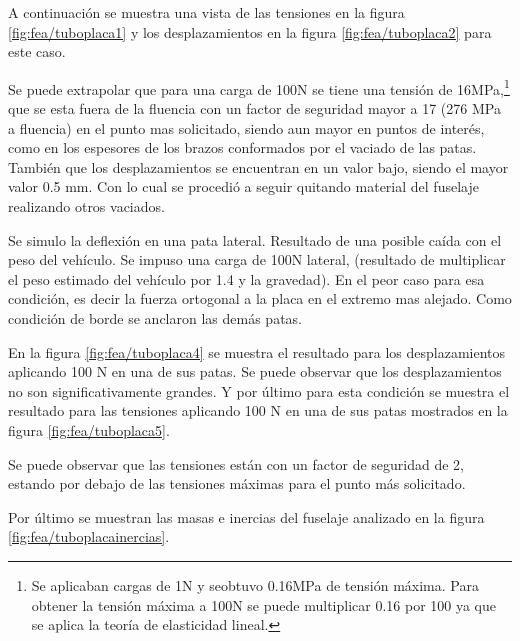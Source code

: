 A continuación se muestra una vista de las tensiones en la figura \ref{fig:fea/tuboplaca1} y los desplazamientos en la figura \ref{fig:fea/tuboplaca2} para este caso.

Se puede extrapolar que para una carga de 100N se tiene una tensión de 16MPa,\footnote{Se aplicaban cargas de 1N y seobtuvo 0.16MPa de tensión máxima. Para obtener la tensión máxima a 100N se puede multiplicar 0.16 por 100 ya que se aplica la teoría de elasticidad lineal.} que se esta fuera de la fluencia con un factor de seguridad mayor a 17 (276 MPa a fluencia) en el punto mas solicitado, siendo aun mayor en puntos de interés, como en los espesores de los brazos conformados por el vaciado de las patas. También que los desplazamientos se encuentran en un valor bajo, siendo el mayor valor 0.5 mm. Con lo cual se procedió a seguir quitando material del fuselaje realizando otros vaciados.

Se simulo la deflexión en una pata lateral. Resultado de una posible caída con el peso del vehículo. Se impuso una carga de 100N lateral,  (resultado de multiplicar el peso estimado del vehículo por 1.4 y la gravedad). En el peor caso para esa condición, es decir la fuerza ortogonal a la placa en el extremo mas alejado. Como condición de borde se anclaron las demás patas.

En la figura \ref{fig:fea/tuboplaca4} se muestra el resultado para los desplazamientos aplicando 100 N en una de sus patas. Se puede observar que los desplazamientos no son significativamente grandes. Y por último para esta condición se muestra el resultado para las tensiones aplicando 100 N en una de sus patas mostrados en la figura \ref{fig:fea/tuboplaca5}.

Se puede observar que las tensiones están con un factor de seguridad de 2, estando por debajo de las tensiones máximas para el punto más solicitado.

Por último se muestran las masas e inercias del fuselaje analizado en la figura \ref{fig:fea/tuboplacainercias}.

